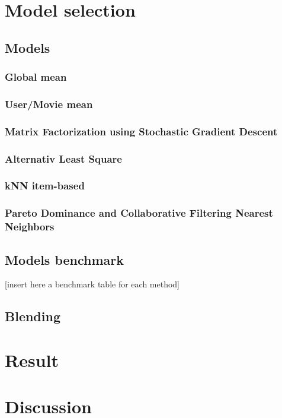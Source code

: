 \documentclass[10pt,conference,compsocconf]{IEEEtran}
\begin{document}
\section{Model selection}

\subsection{Models}
\subsubsection{Global mean}
\subsubsection{User/Movie mean}
\subsubsection{Matrix Factorization using Stochastic Gradient Descent}
\subsubsection{Alternativ Least Square}
\subsubsection{kNN item-based}
\subsubsection{Pareto Dominance and Collaborative Filtering Nearest Neighbors}

\subsection{Models benchmark}
[insert here a benchmark table for each method]

\subsection{Blending}





\section{Result}

\section{Discussion}




\end{document}

